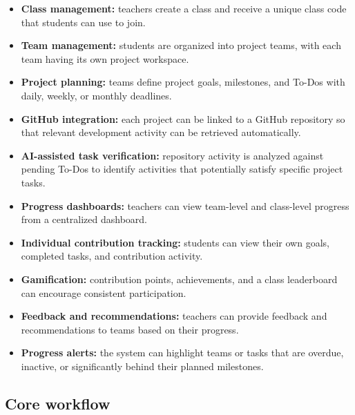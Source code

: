 \documentclass[11pt,a4paper]{article}
\begin{document}
\begin{itemize}[leftmargin=0.7cm]

    \item \textbf{Class management:} teachers create a class and receive a unique class code that students can use to join.

    \item \textbf{Team management:} students are organized into project teams, with each team having its own project workspace.

    \item \textbf{Project planning:} teams define project goals, milestones, and To-Dos with daily, weekly, or monthly deadlines.

    \item \textbf{GitHub integration:} each project can be linked to a GitHub repository so that relevant development activity can be retrieved automatically.

    \item \textbf{AI-assisted task verification:} repository activity is analyzed against pending To-Dos to identify activities that potentially satisfy specific project tasks.

    \item \textbf{Progress dashboards:} teachers can view team-level and class-level progress from a centralized dashboard.

    \item \textbf{Individual contribution tracking:} students can view their own goals, completed tasks, and contribution activity.

    \item \textbf{Gamification:} contribution points, achievements, and a class leaderboard can encourage consistent participation.

    \item \textbf{Feedback and recommendations:} teachers can provide feedback and recommendations to teams based on their progress.

    \item \textbf{Progress alerts:} the system can highlight teams or tasks that are overdue, inactive, or significantly behind their planned milestones.

\end{itemize}


\subsection{Core workflow}
\end{document}
